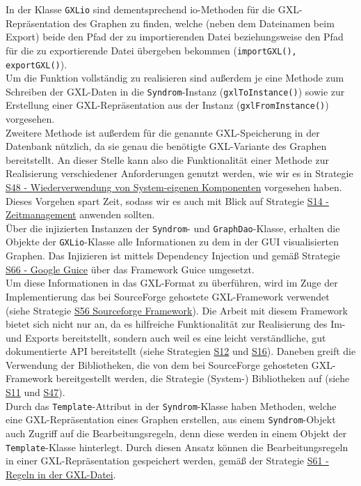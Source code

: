 \documentclass[enabledeprecatedfontcommands,fontsize=11pt,paper=a4,twoside]{scrartcl}
\newcounter{one}
\begin{document}
	In der Klasse \texttt{GXLio} sind dementsprechend io-Methoden für die GXL-Repräsentation des Graphen zu finden, welche (neben dem Dateinamen beim Export) beide den Pfad der zu importierenden Datei beziehungsweise den Pfad für die zu exportierende Datei übergeben bekommen (\texttt{importGXL(), exportGXL()}). \\
	Um die Funktion vollständig zu realisieren sind außerdem je eine Methode zum Schreiben der GXL-Daten in die \texttt{Syndrom}-Instanz (\texttt{gxlToInstance()}) sowie zur Erstellung einer GXL-Repräsentation aus der Instanz (\texttt{gxlFromInstance()}) vorgesehen. \\
	Zweitere Methode ist außerdem für die genannte GXL-Speicherung in der Datenbank nützlich, da sie genau die benötigte GXL-Variante des Graphen bereitstellt. An dieser Stelle kann also die Funktionalität einer Methode zur Realisierung verschiedener Anforderungen genutzt werden, wie wir es in Strategie \hyperlink{aaab}{S48 - Wiederverwendung von System-eigenen Komponenten} vorgesehen haben. Dieses Vorgehen spart Zeit, sodass wir es auch mit Blick auf Strategie \hyperlink{zeitmanagement}{S14 - Zeitmanagement} anwenden sollten. \\ 
	
	Über die injizierten Instanzen der \texttt{Syndrom}- und \texttt{GraphDao}-Klasse, erhalten die Objekte der \texttt{GXLio}-Klasse alle Informationen zu dem in der GUI visualisierten Graphen. Das Injizieren ist mittels Dependency Injection und gemäß Strategie \hyperlink{guice}{S66 - Google Guice} über das Framework Guice umgesetzt. \\
	Um diese Informationen in das GXL-Format zu überführen, wird im Zuge der Implementierung das bei SourceForge gehostete GXL-Framework verwendet (siehe Strategie \hyperlink{ttt}{S56 Sourceforge Framework}). Die Arbeit mit diesem Framework bietet sich nicht nur an, da es hilfreiche Funktionalität zur Realisierung des Im- und Exports bereitstellt, sondern auch weil es eine leicht verständliche, gut dokumentierte API bereitstellt (siehe Strategien \hyperlink{aaaf}{S12} und \hyperlink{ddd}{S16}). Daneben greift die Verwendung der Bibliotheken, die von dem bei SourceForge gehosteten GXL-Framework bereitgestellt werden, die Strategie (System-) Bibliotheken auf (siehe \hyperlink{ccc}{S11} und \hyperlink{qqq}{S47}). \\
	
	Durch das \texttt{Template}-Attribut in der \texttt{Syndrom}-Klasse haben Methoden, welche eine GXL-Repräsentation eines Graphen erstellen, aus einem \texttt{Syndrom}-Objekt auch Zugriff auf die Bearbeitungsregeln, denn diese werden in einem Objekt der \texttt{Template}-Klasse hinterlegt.
	Durch diesen Ansatz können die Bearbeitungsregeln in einer GXL-Repräsentation gespeichert werden, gemäß der Strategie \hyperlink{vvv}{S61 - Regeln in der GXL-Datei}. \\ 
	
\end{document}
